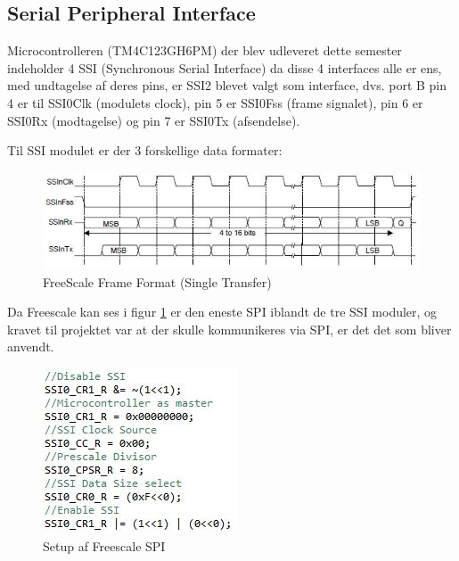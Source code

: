 \subsection{Serial Peripheral Interface}
\label{subsec:SPI}

Microcontrolleren (TM4C123GH6PM) der blev udleveret dette semester  indeholder 4 SSI (Synchronous Serial Interface) da disse 4 interfaces alle er ens, med undtagelse af deres pins, er SSI2 blevet valgt som interface, dvs. port B pin 4 er til SSI0Clk (modulets clock), pin 5 er SSI0Fss (frame signalet), pin 6 er SSI0Rx (modtagelse) og pin 7 er SSI0Tx (afsendelse).

Til SSI modulet er der 3 forskellige data formater:

		\begin{figure}[ht]
			\begin{center}
			\includegraphics[scale=1]{Billeder/FS_Frame_Format.jpg}
			\end{center}
			\caption{FreeScale Frame Format (Single Transfer)}
			\label{fig:FSFrameFormat}
		\end{figure}
	
Da Freescale kan ses i figur \ref{fig:FSFrameFormat} er den eneste SPI iblandt de tre SSI moduler, og kravet til projektet var at der skulle kommunikeres via SPI, er det det som bliver anvendt.

		\begin{figure}[ht]
			\begin{center}
			\includegraphics[scale=0.8]{Billeder/Spi_Setup.jpg}
			\end{center}
			\label{fig:SPI_Setup}
			\caption{Setup af Freescale SPI}
		\end{figure}

